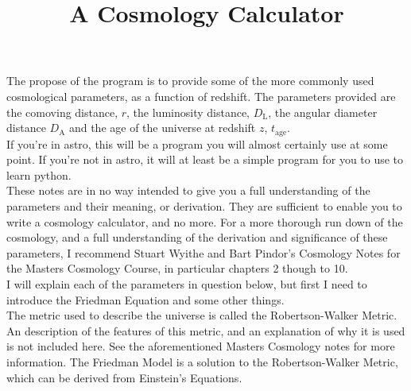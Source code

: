 \documentclass[]{article}
\begin{document}
\title{A Cosmology Calculator }
\maketitle

\noindent The propose of the program is to provide some of the more commonly used cosmological parameters, as a function of redshift. The parameters provided are the comoving distance, $r$, the luminosity distance, $D_\mathrm{L}$, the angular diameter distance $D_\mathrm{A}$ and the age of the universe at redshift $z$, $t_\mathrm{age}$. \\

\noindent If you're in astro, this will be a program you will almost certainly use at some point. If you're not in astro, it will at least be a simple program for you to use to learn python. \\

\noindent These notes are in no way intended to give you a full understanding of the parameters and their meaning, or derivation. They are sufficient to enable you to write a cosmology calculator, and no more. For a more thorough run down of the cosmology, and a full understanding of the derivation and significance of these parameters, I recommend Stuart Wyithe and Bart Pindor’s Cosmology Notes for the Masters Cosmology Course, in particular chapters 2 though to 10. \\

\noindent I will explain each of the parameters in question below, but first I need to introduce the Friedman Equation and some other things.\\

\noindent The metric used to describe the universe is called the Robertson-Walker Metric. An description of the features of this metric, and an explanation of why it is used is not included here. See the aforementioned Masters Cosmology notes for more information. The Friedman Model is a solution to the Robertson-Walker Metric, which can be derived from Einstein’s Equations.\\
\end{document}
